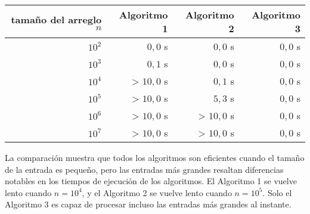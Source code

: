 \begin{center}
    \begin{tabular}{rrrr}
        tamaño del arreglo $n$ & Algoritmo 1 & Algoritmo 2 & Algoritmo 3 \\
        \hline
        $10^2$                 & $0,0$ s     & $0,0$ s     & $0,0$ s     \\
        $10^3$                 & $0,1$ s     & $0,0$ s     & $0,0$ s     \\
        $10^4$                 & > $10,0$ s  & $0,1$ s     & $0,0$ s     \\
        $10^5$                 & > $10,0$ s  & $5,3$ s     & $0,0$ s     \\
        $10^6$                 & > $10,0$ s  & > $10,0$ s  & $0,0$ s     \\
        $10^7$                 & > $10,0$ s  & > $10,0$ s  & $0,0$ s     \\
    \end{tabular}
\end{center}

La comparación muestra que todos los algoritmos
son eficientes cuando el tamaño de la entrada es pequeño,
pero las entradas más grandes resaltan diferencias notables
en los tiempos de ejecución de los algoritmos.
El Algoritmo 1 se vuelve lento
cuando $n=10^4$, y el Algoritmo 2
se vuelve lento cuando $n=10^5$.
Solo el Algoritmo 3 es capaz de procesar
incluso las entradas más grandes al instante.
